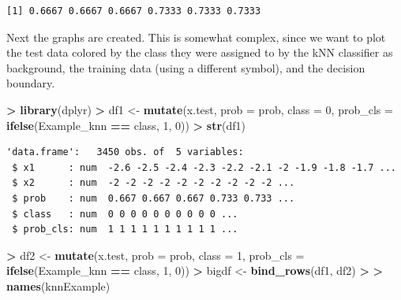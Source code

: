 \documentclass[
]{krantz}
\makeatletter
\newenvironment{Shaded}{\begin{snugshade}}{\end{snugshade}}
\newcommand{\DataTypeTok}[1]{\textcolor[rgb]{0.27,0.27,0.27}{#1}}
\newcommand{\DecValTok}[1]{\textcolor[rgb]{0.06,0.06,0.06}{#1}}
\newcommand{\ErrorTok}[1]{\textcolor[rgb]{0.14,0.14,0.14}{\textbf{#1}}}
\newcommand{\KeywordTok}[1]{\textcolor[rgb]{0.27,0.27,0.27}{\textbf{#1}}}
\newcommand{\NormalTok}[1]{#1}
\newcommand{\OperatorTok}[1]{\textcolor[rgb]{0.43,0.43,0.43}{\textbf{#1}}}
\newcommand{\StringTok}[1]{\textcolor[rgb]{0.5,0.5,0.5}{#1}}
\newenvironment{kframe}{%
\medskip{}
\setlength{\fboxsep}{.8em}
 \def\at@end@of@kframe{}%
 \ifinner\ifhmode%
  \def\at@end@of@kframe{\end{minipage}}%
  \begin{minipage}{\columnwidth}%
 \fi\fi%
 \def\FrameCommand##1{\hskip\@totalleftmargin \hskip-\fboxsep
 \colorbox{shadecolor}{##1}\hskip-\fboxsep
     \hskip-\linewidth \hskip-\@totalleftmargin \hskip\columnwidth}%
 \MakeFramed {\advance\hsize-\width
   \@totalleftmargin\z@ \linewidth\hsize
   \@setminipage}}%
 {\par\unskip\endMakeFramed%
 \at@end@of@kframe}
\renewenvironment{Shaded}{\begin{kframe}}{\end{kframe}}
\makeatother
\begin{document}
\begin{verbatim}
[1] 0.6667 0.6667 0.6667 0.7333 0.7333 0.7333
\end{verbatim}

Next the graphs are created. This is somewhat complex, since we want to plot the test data colored by the class they were assigned to by the kNN classifier as background, the training data (using a different symbol), and the decision boundary.

\begin{Shaded}
\begin{Highlighting}[]
\OperatorTok{\textgreater{}}\StringTok{ }\KeywordTok{library}\NormalTok{(dplyr)}
\OperatorTok{\textgreater{}}\StringTok{ }\NormalTok{df1 \textless{}{-}}\StringTok{ }\KeywordTok{mutate}\NormalTok{(x.test, }\DataTypeTok{prob =}\NormalTok{ prob, }\DataTypeTok{class =} \DecValTok{0}\NormalTok{,  }\DataTypeTok{prob\_cls =} \KeywordTok{ifelse}\NormalTok{(Example\_knn }\OperatorTok{==}\StringTok{ }\NormalTok{class, }\DecValTok{1}\NormalTok{, }\DecValTok{0}\NormalTok{))}
\OperatorTok{\textgreater{}}\StringTok{ }\KeywordTok{str}\NormalTok{(df1)}
\end{Highlighting}
\end{Shaded}

\begin{verbatim}
'data.frame':   3450 obs. of  5 variables:
 $ x1      : num  -2.6 -2.5 -2.4 -2.3 -2.2 -2.1 -2 -1.9 -1.8 -1.7 ...
 $ x2      : num  -2 -2 -2 -2 -2 -2 -2 -2 -2 -2 ...
 $ prob    : num  0.667 0.667 0.667 0.733 0.733 ...
 $ class   : num  0 0 0 0 0 0 0 0 0 0 ...
 $ prob_cls: num  1 1 1 1 1 1 1 1 1 1 ...
\end{verbatim}

\begin{Shaded}
\begin{Highlighting}[]
\OperatorTok{\textgreater{}}\StringTok{ }\NormalTok{df2 \textless{}{-}}\StringTok{ }\KeywordTok{mutate}\NormalTok{(x.test, }\DataTypeTok{prob =}\NormalTok{ prob, }\DataTypeTok{class =} \DecValTok{1}\NormalTok{,  }\DataTypeTok{prob\_cls =} \KeywordTok{ifelse}\NormalTok{(Example\_knn }\OperatorTok{==}\StringTok{ }\NormalTok{class, }\DecValTok{1}\NormalTok{, }\DecValTok{0}\NormalTok{))}
\OperatorTok{\textgreater{}}\StringTok{ }\NormalTok{bigdf \textless{}{-}}\StringTok{ }\KeywordTok{bind\_rows}\NormalTok{(df1, df2)}
\OperatorTok{\textgreater{}}\StringTok{ }
\ErrorTok{\textgreater{}}\StringTok{ }\KeywordTok{names}\NormalTok{(knnExample)}
\end{Highlighting}
\end{Shaded}
\end{document}

